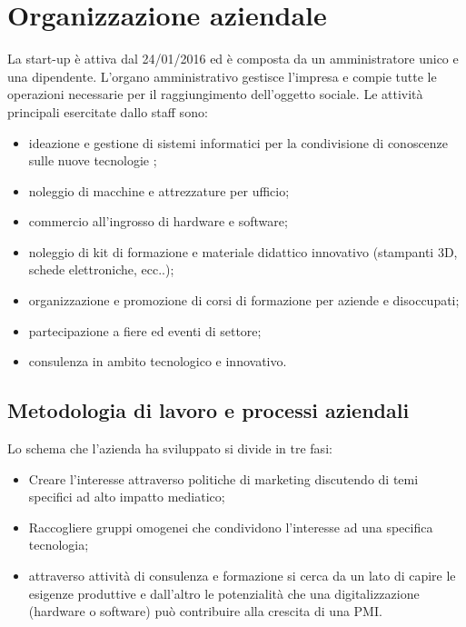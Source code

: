 \section{Organizzazione aziendale}
La start-up è attiva dal 24/01/2016 ed è composta da un amministratore unico e una dipendente.
L'organo amministrativo gestisce l'impresa e compie tutte le operazioni necessarie per il raggiungimento dell'oggetto sociale.
Le attività principali esercitate dallo staff sono:
\begin{itemize}
\item ideazione e gestione di sistemi informatici per la condivisione di conoscenze sulle nuove tecnologie ;
\item noleggio di macchine e attrezzature per ufficio;
\item commercio all'ingrosso di hardware e software;
\item noleggio di kit di formazione e materiale didattico innovativo (stampanti 3D, schede elettroniche, ecc..);
\item organizzazione e promozione di corsi di formazione per aziende e disoccupati;
\item partecipazione a fiere ed eventi di settore;
\item consulenza in ambito tecnologico e innovativo.
\end{itemize}
\subsection{Metodologia di lavoro e processi aziendali}
Lo schema che l'azienda ha sviluppato si divide in tre fasi:
\begin{itemize}
\item Creare l’interesse attraverso politiche di marketing discutendo di temi specifici ad alto impatto mediatico;
\item Raccogliere gruppi omogenei che condividono l'interesse ad una specifica tecnologia;
\item attraverso attività di consulenza e formazione si cerca da un lato di capire le esigenze produttive e dall’altro le potenzialità che una digitalizzazione (hardware o software) può contribuire alla crescita di una PMI.
\end{itemize}

